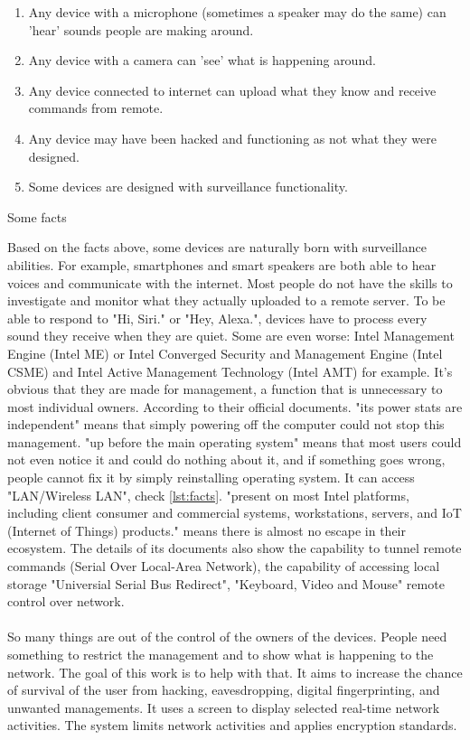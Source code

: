 \documentclass[mscthesis]{usiinfthesis}
\begin{document}
\begin{table}[H]
  \begin{enumerate}
    \item Any device with a microphone (sometimes a speaker may do the same) can 'hear' sounds people are making around.
    \item Any device with a camera can 'see' what is happening around.
    \item Any device connected to internet can upload what they know and receive commands from remote.
    \item Any device may have been hacked and functioning as not what they were designed.
    \item Some devices are designed with surveillance functionality.
  \end{enumerate}
  \caption{Some facts}
  \label{lst:facts}
\end{table}
Based on the facts above, some devices are naturally born with surveillance abilities. For example, smartphones and smart speakers are both able to hear voices and communicate with the internet. Most people do not have the skills to investigate and monitor what they actually uploaded to a remote server. To be able to respond to "Hi, Siri." or "Hey, Alexa.", devices have to process every sound they receive when they are quiet. Some are even worse: Intel Management Engine (Intel ME) or Intel Converged Security and Management Engine (Intel CSME) and Intel Active Management Technology (Intel AMT) for example. It's obvious that they are made for management, a function that is unnecessary to most individual owners. According to their official documents. "its power stats are independent" means that simply powering off the computer could not stop this management. "up before the main operating system" means that most users could not even notice it and could do nothing about it, and if something goes wrong, people cannot fix it by simply reinstalling operating system. It can access "LAN/Wireless LAN", check \cref{lst:facts}. "present on most Intel platforms, including client consumer and commercial systems, workstations, servers, and IoT (Internet of Things) products." means there is almost no escape in their ecosystem. The details of its documents also show the capability to tunnel remote commands (Serial Over Local-Area Network), the capability of accessing local storage "Universial Serial Bus Redirect", "Keyboard, Video and Mouse" remote control over network.
\paragraph{}
So many things are out of the control of the owners of the devices. People need something to restrict the management and to show what is happening to the network. The goal of this work is to help with that. It aims to increase the chance of survival of the user from hacking, eavesdropping, digital fingerprinting, and unwanted managements. It uses a screen to display selected real-time network activities. The system limits network activities and applies encryption standards.
\end{document}
